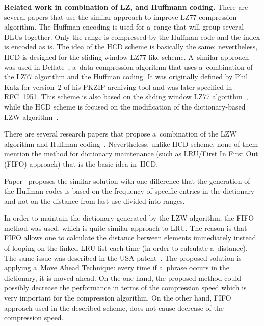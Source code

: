 \begin{multicols}{2}
\noindent
\textbf{Related work in combination of LZ, and Huffmann coding.}
 There are several papers that use the similar approach to improve LZ77 
 compression algorithm. The Huffman encoding is used for a~range that will 
 group several DLUs together.
 Only the range is compressed by the Huffman code and the index is encoded as is. 
The idea of the {HCD} scheme is basically the same; nevertheless, 
{HCD} is designed for the  sliding window {LZ77}-like scheme.
  A~similar approach was used in Deflate~\cite{DEFLATE}, a~data compression 
  algorithm that uses a~combination of the {LZ77} algorithm and the 
  Huffman coding. It was originally defined by Phil Katz for version~2 of his 
  PKZIP archiving tool and was later specified in RFC~1951. This scheme is also 
  based on the sliding window {LZ77} algorithm~\cite{ZL77}, while the 
{HCD} scheme is focused on the modification of the dictionary-based 
{LZW} algorithm~\cite{ZL77}.

There are several research papers that propose a~combination of the 
{LZW} algorithm and Huffman coding~\cite{LZWH1991, LZWH2010}. Nevertheless, 
unlike HCD scheme,  none of them mention the method for dictionary maintenance 
(such as LRU/First In First Out ({FIFO}) 
approach) that is the basic idea in~HCD.

Paper~\cite{LZWH2011} proposes the similar solution with one difference that 
 the generation of the Huffman codes is based on the frequency of specific entries 
 in the dictionary and not on the distance from last use divided into ranges.



In order to maintain the dictionary generated by the {LZW} 
algorithm, the FIFO method was used, which is quite 
similar approach to {LRU}. The reason is that {FIFO} 
allows one to calculate the distance between elements immediately instead of 
looping on the linked {LRU} list each time (in order to calculate a~distance). 
The same issue was described in the USA patent~\cite{LZWH}. The proposed solution is 
applying a~Move Ahead Technique: every time if a~phrase occurs in the dictionary, it 
is moved ahead. On the one hand, the proposed method could possibly decrease the 
performance in terms of the compression speed which is very important for the 
compression algorithm. On the other hand, \mbox{FIFO} approach used in the described
scheme, 
does not cause decrease of the compression speed.





\end{multicols}
